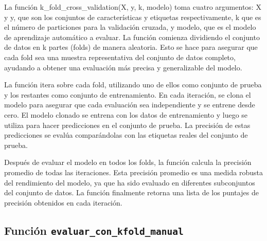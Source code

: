 \documentclass[12pt]{article}
\begin{document}
La función k\_fold\_cross\_validation(X, y, k, modelo) toma cuatro argumentos: X y y, que son los conjuntos de características y etiquetas respectivamente, k que es el número de particiones para la validación cruzada, y modelo, que es el modelo de aprendizaje automático a evaluar. La función comienza dividiendo el conjunto de datos en k partes (folds) de manera aleatoria. Esto se hace para asegurar que cada fold sea una muestra representativa del conjunto de datos completo, ayudando a obtener una evaluación más precisa y generalizable del modelo.\vspace{1cm}


La función itera sobre cada fold, utilizando uno de ellos como conjunto de prueba y los restantes como conjunto de entrenamiento. En cada iteración, se clona el modelo para asegurar que cada evaluación sea independiente y se entrene desde cero. El modelo clonado se entrena con los datos de entrenamiento y luego se utiliza para hacer predicciones en el conjunto de prueba. La precisión de estas predicciones se evalúa comparándolas con las etiquetas reales del conjunto de prueba.\vspace{1cm}

Después de evaluar el modelo en todos los folds, la función calcula la precisión promedio de todas las iteraciones. Esta precisión promedio es una medida robusta del rendimiento del modelo, ya que ha sido evaluado en diferentes subconjuntos del conjunto de datos. La función finalmente retorna una lista de los puntajes de precisión obtenidos en cada iteración.\vspace{1cm}

\vspace{1cm}

\subsection*{Función \texttt{evaluar\_con\_kfold\_manual}}
\vspace{1cm}
\end{document}
